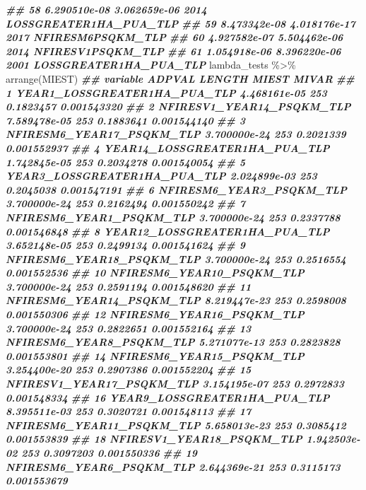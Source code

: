 \documentclass[10pt,landscape,a3paper]{article}
\newenvironment{Shaded}{\begin{snugshade}}{\end{snugshade}}
\newcommand{\DocumentationTok}[1]{\textcolor[rgb]{0.56,0.35,0.01}{\textbf{\textit{#1}}}}
\newcommand{\FunctionTok}[1]{\textcolor[rgb]{0.00,0.00,0.00}{#1}}
\newcommand{\NormalTok}[1]{#1}
\newcommand{\SpecialCharTok}[1]{\textcolor[rgb]{0.00,0.00,0.00}{#1}}
\begin{document}
\begin{Shaded}
\begin{Highlighting}[]
\DocumentationTok{\#\# 58 6.290510e{-}08 3.062659e{-}06 2014     LOSSGREATER1HA\_PUA\_TLP}
\DocumentationTok{\#\# 59 8.473342e{-}08 4.018176e{-}17 2017          NFIRESM6PSQKM\_TLP}
\DocumentationTok{\#\# 60 4.927582e{-}07 5.504462e{-}06 2014          NFIRESV1PSQKM\_TLP}
\DocumentationTok{\#\# 61 1.054918e{-}06 8.396220e{-}06 2001     LOSSGREATER1HA\_PUA\_TLP}
\NormalTok{lambda\_tests }\SpecialCharTok{\%\textgreater{}\%} \FunctionTok{arrange}\NormalTok{(MIEST)}
\DocumentationTok{\#\#                              variable       ADPVAL LENGTH     MIEST       MIVAR}
\DocumentationTok{\#\# 1        YEAR1\_LOSSGREATER1HA\_PUA\_TLP 4.468161e{-}05    253 0.1823457 0.001543320}
\DocumentationTok{\#\# 2           NFIRESV1\_YEAR14\_PSQKM\_TLP 7.589478e{-}05    253 0.1883641 0.001544140}
\DocumentationTok{\#\# 3           NFIRESM6\_YEAR17\_PSQKM\_TLP 3.700000e{-}24    253 0.2021339 0.001552937}
\DocumentationTok{\#\# 4       YEAR14\_LOSSGREATER1HA\_PUA\_TLP 1.742845e{-}05    253 0.2034278 0.001540054}
\DocumentationTok{\#\# 5        YEAR3\_LOSSGREATER1HA\_PUA\_TLP 2.024899e{-}03    253 0.2045038 0.001547191}
\DocumentationTok{\#\# 6            NFIRESM6\_YEAR3\_PSQKM\_TLP 3.700000e{-}24    253 0.2162494 0.001550242}
\DocumentationTok{\#\# 7            NFIRESM6\_YEAR1\_PSQKM\_TLP 3.700000e{-}24    253 0.2337788 0.001546848}
\DocumentationTok{\#\# 8       YEAR12\_LOSSGREATER1HA\_PUA\_TLP 3.652148e{-}05    253 0.2499134 0.001541624}
\DocumentationTok{\#\# 9           NFIRESM6\_YEAR18\_PSQKM\_TLP 3.700000e{-}24    253 0.2516554 0.001552536}
\DocumentationTok{\#\# 10          NFIRESM6\_YEAR10\_PSQKM\_TLP 3.700000e{-}24    253 0.2591194 0.001548620}
\DocumentationTok{\#\# 11          NFIRESM6\_YEAR14\_PSQKM\_TLP 8.219447e{-}23    253 0.2598008 0.001550306}
\DocumentationTok{\#\# 12          NFIRESM6\_YEAR16\_PSQKM\_TLP 3.700000e{-}24    253 0.2822651 0.001552164}
\DocumentationTok{\#\# 13           NFIRESM6\_YEAR8\_PSQKM\_TLP 5.271077e{-}13    253 0.2823828 0.001553801}
\DocumentationTok{\#\# 14          NFIRESM6\_YEAR15\_PSQKM\_TLP 3.254400e{-}20    253 0.2907386 0.001552204}
\DocumentationTok{\#\# 15          NFIRESV1\_YEAR17\_PSQKM\_TLP 3.154195e{-}07    253 0.2972833 0.001548334}
\DocumentationTok{\#\# 16       YEAR9\_LOSSGREATER1HA\_PUA\_TLP 8.395511e{-}03    253 0.3020721 0.001548113}
\DocumentationTok{\#\# 17          NFIRESM6\_YEAR11\_PSQKM\_TLP 5.658013e{-}23    253 0.3085412 0.001553839}
\DocumentationTok{\#\# 18          NFIRESV1\_YEAR18\_PSQKM\_TLP 1.942503e{-}02    253 0.3097203 0.001550336}
\DocumentationTok{\#\# 19           NFIRESM6\_YEAR6\_PSQKM\_TLP 2.644369e{-}21    253 0.3115173 0.001553679}

\end{Highlighting}
\end{Shaded}
\end{document}
